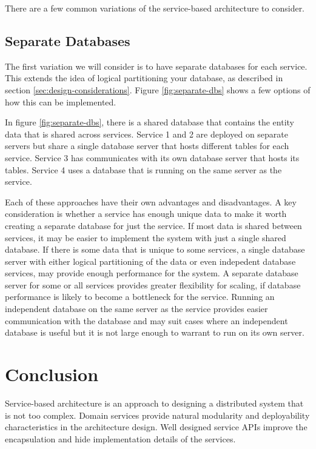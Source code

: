 There are a few common variations of the service-based architecture to consider.

\subsection{Separate Databases}

The first variation  we will consider is to have separate databases for each service.
This extends the idea of logical partitioning your database, as described in section \ref{sec:design-considerations}.
Figure \ref{fig:separate-dbs} shows a few options of how this can be implemented.


In figure \ref{fig:separate-dbs}, there is a shared database that contains the entity data that is shared across services.
Service 1 and 2 are deployed on separate servers but share a single database server that hosts different tables for each service.
Service 3 has communicates with its own database server that hosts its tables.
Service 4 uses a database that is running on the same server as the service.

Each of these approaches have their own advantages and disadvantages.
A key consideration is whether a service has enough unique data to make it worth creating a separate database for just the service.
If most data is shared between services, it may be easier to implement the system with just a single shared database.
If there is some data that is unique to some services, a single database server
with either logical partitioning of the data or even indepedent database services,
may provide enough performance for the system.
A separate database server for some or all services provides greater flexibility for scaling,
if database performance is likely to become a bottleneck for the service.
Running an independent database on the same server as the service provides easier communication with the database
and may suit cases where an independent database is useful but it is not large enough to warrant to run on its own server.


\section{Conclusion}

Service-based architecture is an approach to designing a distributed system that is not too complex.
Domain services provide natural modularity and deployability characteristics in the architecture design.
Well designed service APIs improve the encapsulation and hide implementation details of the services.
